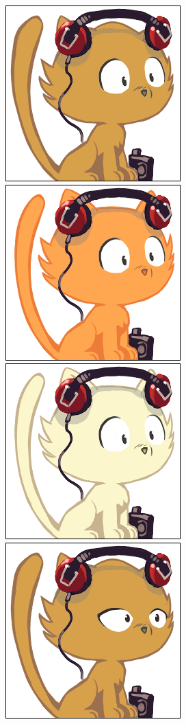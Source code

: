 \documentclass[a4paper, 12pt]{article}
\begin{document}
  \includegraphics[scale=0.45]{out/1.png}
  \includegraphics[scale=0.45]{out/2.png}
  \includegraphics[scale=0.45]{out/3.png}
  \includegraphics[scale=0.45]{out/4.png}
\end{document}
